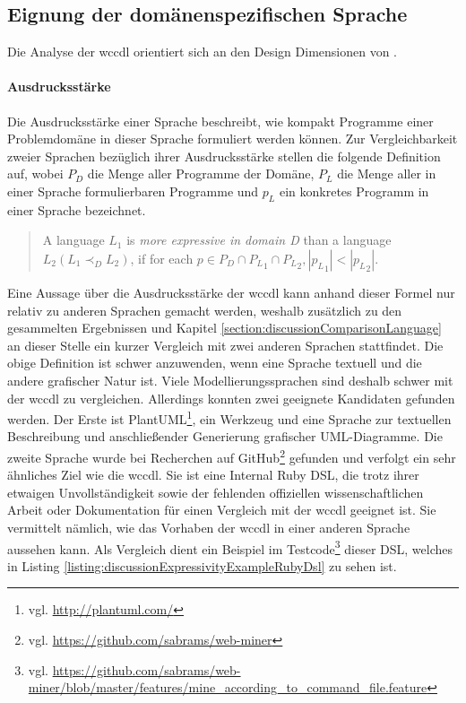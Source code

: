 \subsection{Eignung der domänenspezifischen Sprache}
    \label{section:discussionInterpretationLanguage}
    Die Analyse der \gls{wccdl} orientiert sich
    an den Design Dimensionen von \cite{voelter:DslEngineering}.

    \paragraph*{Ausdrucksstärke}
    Die Ausdrucksstärke einer Sprache beschreibt,
    wie kompakt Programme einer Problemdomäne in dieser Sprache
    formuliert werden können.
    Zur Vergleichbarkeit zweier Sprachen bezüglich ihrer Ausdrucksstärke
    stellen \citet[Kapitel 4.1]{voelter:DslEngineering} die folgende
    Definition auf, wobei
    $P_D$ die Menge aller Programme der Domäne,
    $P_L$ die Menge aller in einer Sprache formulierbaren Programme und
    $p_L$ ein konkretes Programm in einer Sprache bezeichnet.

    \begin{quote}
        A language $L_1$ is \textit{more expressive in domain D}
        than a language $L_2 (L_1 {\prec}_D L_2)$,
        if for each $p \in P_D \cap {P_L}_1 \cap {P_L}_2, |{p_L}_1| < |{p_L}_2|$.
    \end{quote}

    Eine Aussage über die Ausdrucksstärke der \gls{wccdl} kann anhand dieser Formel
    nur relativ zu anderen Sprachen gemacht werden,
    weshalb zusätzlich zu den gesammelten Ergebnissen und
    Kapitel \ref{section:discussionComparisonLanguage}
    an dieser Stelle ein kurzer Vergleich mit zwei anderen Sprachen stattfindet.
    Die obige Definition ist schwer anzuwenden,
    wenn eine Sprache textuell und die andere grafischer Natur ist.
    Viele Modellierungssprachen sind deshalb schwer mit der \gls{wccdl} zu vergleichen.
    Allerdings konnten zwei geeignete Kandidaten gefunden werden.
    Der Erste ist PlantUML\footnote{vgl. \url{http://plantuml.com/}},
    ein Werkzeug und eine Sprache zur textuellen Beschreibung und anschließender
    Generierung grafischer UML-Diagramme.
    Die zweite Sprache wurde bei Recherchen auf
    GitHub\footnote{vgl. \url{https://github.com/sabrams/web-miner}} gefunden
    und verfolgt ein sehr ähnliches Ziel wie die \gls{wccdl}.
    Sie ist eine Internal Ruby DSL, die trotz ihrer etwaigen Unvollständigkeit sowie der fehlenden
    offiziellen wissenschaftlichen Arbeit oder Dokumentation
    für einen Vergleich mit der \gls{wccdl} geeignet ist.
    Sie vermittelt nämlich, wie das Vorhaben der \gls{wccdl}
    in einer anderen Sprache aussehen kann.
    Als Vergleich dient ein Beispiel im
    Testcode\footnote{vgl. \url{https://github.com/sabrams/web-miner/blob/master/features/mine_according_to_command_file.feature}}
    dieser DSL, welches in Listing \ref{listing:discussionExpressivityExampleRubyDsl}
    zu sehen ist.

